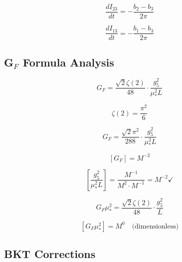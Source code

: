 \documentclass[11pt,a4paper]{article}
\theoremstyle{definition}
\begin{document}
\begin{equation}
\label{eq:inv_ext_9}
\frac{dI_{23}}{dt} = -\frac{b_2 - b_3}{2\pi}
\end{equation}

\begin{equation}
\label{eq:inv_ext_10}
\frac{dI_{13}}{dt} = -\frac{b_1 - b_3}{2\pi}
\end{equation}

\subsection{G$_F$ Formula Analysis}
\label{subsec:GF_extended}

\begin{equation}
\label{eq:GF_ext_1}
G_F = \frac{\sqrt{2}\zeta(2)}{48}\cdot\frac{g_5^2}{\mu_*^2 L}
\end{equation}

\begin{equation}
\label{eq:GF_ext_2}
\zeta(2) = \frac{\pi^2}{6}
\end{equation}

\begin{equation}
\label{eq:GF_ext_3}
G_F = \frac{\sqrt{2}\pi^2}{288}\cdot\frac{g_5^2}{\mu_*^2 L}
\end{equation}

\begin{equation}
\label{eq:GF_ext_4}
[G_F] = M^{-2}
\end{equation}

\begin{equation}
\label{eq:GF_ext_5}
\left[\frac{g_5^2}{\mu_*^2 L}\right] = \frac{M^{-1}}{M^2 \cdot M^{-1}} = M^{-2} \checkmark
\end{equation}

\begin{equation}
\label{eq:GF_ext_6}
G_F\mu_*^2 = \frac{\sqrt{2}\zeta(2)}{48}\cdot\frac{g_5^2}{L}
\end{equation}

\begin{equation}
\label{eq:GF_ext_7}
[G_F\mu_*^2] = M^0 \quad \text{(dimensionless)}
\end{equation}

\subsection{BKT Corrections}
\label{subsec:bkt_extended}
\end{document}

